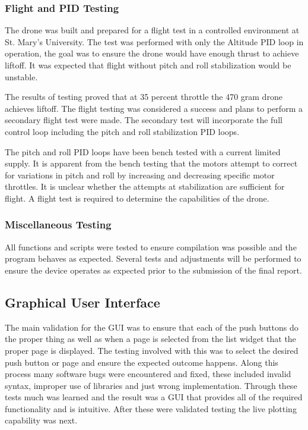 \subsubsection{Flight and PID Testing}

The drone was built and prepared for a flight test in a controlled environment at St. Mary's University. The test was performed with only the Altitude PID loop in operation, the goal was to ensure the drone would have enough thrust to achieve liftoff. It was expected that flight without pitch and roll stabilization would be unstable.

The results of testing proved that at 35 percent throttle the 470 gram drone achieves liftoff. The flight testing was considered a success and plans to perform a secondary flight test were made. The secondary test will incorporate the full control loop including the pitch and roll stabilization PID loops.

The pitch and roll PID loops have been bench tested with a current limited supply. It is apparent from the bench testing that the motors attempt to correct for variations in pitch and roll by increasing and decreasing specific motor throttles. It is unclear whether the attempts at stabilization are sufficient for flight. A flight test is required to determine the capabilities of the drone.

\subsubsection{Miscellaneous Testing}

All functions and scripts were tested to ensure compilation was possible and the program behaves as expected. Several tests and adjustments will be performed to ensure the device operates as expected prior to the submission of the final report. 

\subsection{Graphical User Interface}
The main validation for the GUI was to ensure that each of the push buttons do the proper thing as well as when a page is selected from the list widget that the proper page is displayed. The testing involved with this was to select the desired push button or page and ensure the expected outcome happens. Along this process many software bugs were encountered and fixed, these included invalid syntax, improper use of libraries and just wrong implementation. Through these tests much was learned and the result was a GUI that provides all of the required functionality and is intuitive. After these were validated testing the live plotting capability was next. 
